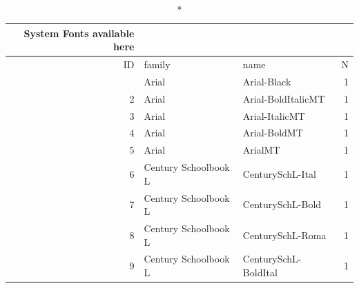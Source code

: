 \documentclass[
  12pt,
  letterpaper,
  DIV=11,
  numbers=noendperiod]{scrartcl}
\begin{document}
\begin{longtable*}{rllr}
\caption*{
{\large System Fonts available here}
} \\ 
\toprule
ID & family & name & N \\ 
\midrule{} & Arial & Arial-Black & 1 \\ 
2 & Arial & Arial-BoldItalicMT & 1 \\ 
3 & Arial & Arial-ItalicMT & 1 \\ 
4 & Arial & Arial-BoldMT & 1 \\ 
5 & Arial & ArialMT & 1 \\ 
6 & Century Schoolbook L & CenturySchL-Ital & 1 \\ 
7 & Century Schoolbook L & CenturySchL-Bold & 1 \\ 
8 & Century Schoolbook L & CenturySchL-Roma & 1 \\ 
9 & Century Schoolbook L & CenturySchL-BoldItal & 1 \\ 
\bottomrule
\end{longtable*}
\end{document}
